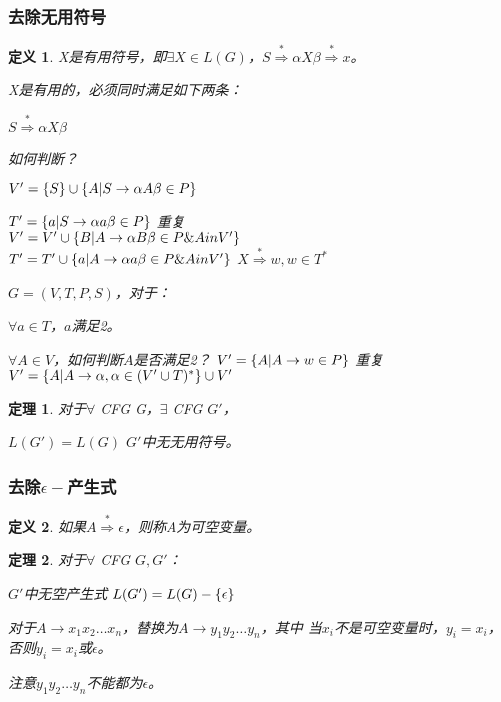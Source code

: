 \documentclass[twocolumn,zihao=5,linespread=1,heading=false,autoindent=0pt]{ctexart}
\DeclarePairedDelimiter{\set}{\{}{\}}
\theoremstyle{exampstyle} \newtheorem{definition}{定义}[section]
\theoremstyle{exampstyle} \newtheorem{example}{例}[section]
\theoremstyle{exampstyle} \newtheorem{theorem}{定理}[section]
\theoremstyle{exampstyle} \newtheorem{lemma}{引理}[section]
\theoremstyle{exampstyle} \newtheorem{myproof}{证明}[section]
\begin{document}
\subsubsection{去除无用符号}
\begin{definition}
    X是有用符号，即$\exists X \in L(G)$，$S \overset{*} \Rightarrow
    \alpha X \beta \overset{*} \Rightarrow x$。

    X是有用的，必须同时满足如下两条：
    \begin{outline}[cenumerate]
        \1 $S \overset{*} \Rightarrow \alpha X \beta$
            
            如何判断？

            \2 $V' = \set{S} \cup \set{A | S \to \alpha A \beta \in P}$

                $T' = \set{a | S \to \alpha a \beta \in P}$
            \2 重复 \\
            $V' = V' \cup \set{B | A \to \alpha B \beta \in P \& A in V'}$ \\
            $T' = T' \cup \set{a | A \to \alpha a \beta \in P \& A in V'}$
        \1 $X \overset{*} \Rightarrow w, w \in T^*$
        
            $G = (V, T, P, S)$，对于：

            $\forall a \in T$，$a$满足2。
        
            $\forall A \in V$，如何判断$A$是否满足2？
                \2 $V' = \set{A | A \to w \in P}$
                \2 重复 $V' = \set{A | A \to \alpha, \alpha \in (V' \cup T)^*} \cup V'$
    \end{outline}
\end{definition}
\begin{theorem}
    对于$\forall$ CFG G，$\exists$ CFG $G'$，
    \begin{outline}[cenumerate]
        \1 $L(G') = L(G)$
        \1 $G'$中无无用符号。
    \end{outline}
\end{theorem}


\subsubsection{去除$\epsilon-$产生式}
\begin{definition}
    如果$A \overset{*} \Rightarrow \epsilon$，则称A为可空变量。
\end{definition}
\begin{theorem}
    对于$\forall$ CFG $G, G'$：
    \begin{outline}[cenumerate]
        \1 $G'$中无空产生式
        \1 $L(G') = L(G) - \set{\epsilon}$
    \end{outline}
    对于$A \to x_1x_2\dots x_n$，替换为$A \to y_1y_2\dots y_n$，其中
    当$x_i$不是可空变量时，$y_i = x_i$，否则$y_i = x_i$或$\epsilon$。

    注意$y_1y_2\dots y_n$不能都为$\epsilon$。
\end{theorem}
\end{document}

